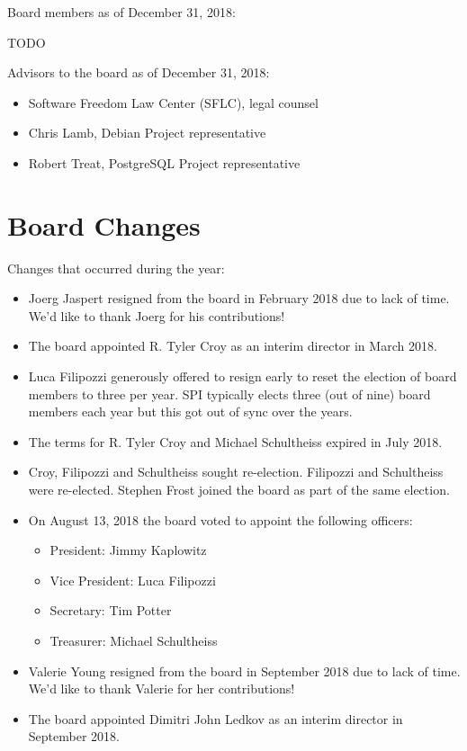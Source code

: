 \documentclass[a4paper]{report}
\begin{document}
Board members as of December 31, 2018:

TODO

Advisors to the board as of December 31, 2018:

\begin{itemize}
\item Software Freedom Law Center (SFLC), legal counsel
\item Chris Lamb, Debian Project representative
\item Robert Treat, PostgreSQL Project representative
\end{itemize}

\section{Board Changes}

Changes that occurred during the year:

\begin{itemize}

\item Joerg Jaspert resigned from the board in February 2018 due to
lack of time.  We'd like to thank Joerg for his contributions!

\item The board appointed R. Tyler Croy as an interim director in March
2018.

\item Luca Filipozzi generously offered to resign early to reset the
election of board members to three per year. SPI typically elects three
(out of nine) board members each year but this got out of sync over the
years.

\item The terms for R. Tyler Croy and Michael Schultheiss expired in
July 2018.

\item Croy, Filipozzi and Schultheiss sought re-election.  Filipozzi and
Schultheiss were re-elected.  Stephen Frost joined the board as part of
the same election.

\item On August 13, 2018 the board voted to appoint the following
officers:

\begin{itemize}
\item President: Jimmy Kaplowitz
\item Vice President: Luca Filipozzi
\item Secretary: Tim Potter
\item Treasurer: Michael Schultheiss
\end{itemize}

\item Valerie Young resigned from the board in September 2018 due to
lack of time.  We'd like to thank Valerie for her contributions!

\item The board appointed Dimitri John Ledkov as an interim director
in September 2018.

\end{itemize}
\end{document}
